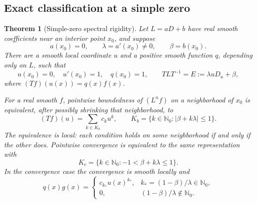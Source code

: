 \documentclass[11pt,reqno]{amsart}
\numberwithin{equation}{section}
\newtheorem{theorem}{Theorem}[section]
\theoremstyle{definition}
\theoremstyle{remark}
\newcommand{\N}{\mathbb N_0}
\begin{document}
\subsection{Exact classification at a simple zero}
\begin{theorem}[Simple-zero spectral rigidity]\label{thm:simple}
Let $L=aD+b$ have real smooth coefficients near an interior point $x_0$, and suppose
\[
 a(x_0)=0,\qquad \lambda=a'(x_0)\ne0,\qquad \beta=b(x_0).
\]
There are a smooth local coordinate $u$ and a positive smooth function $q$, depending only on $L$, such that
\[
 u(x_0)=0,\quad u'(x_0)=1,\quad q(x_0)=1,
 \qquad TL T^{-1}=E:=\lambda uD_u+\beta,
\]
where $(Tf)(u(x))=q(x)f(x)$.

For a real smooth $f$, pointwise boundedness of $(L^nf)$ on a neighborhood of $x_0$ is equivalent, after possibly shrinking that neighborhood, to
\begin{equation}\label{eq:boundedmodes}
 (Tf)(u)=\sum_{k\in K_b}c_k u^k,
 \qquad K_b=\{k\in\N:|\beta+k\lambda|\le1\}.
\end{equation}
The equivalence is local: each condition holds on some neighborhood if and only if the other does. Pointwise convergence is equivalent to the same representation with
\begin{equation}\label{eq:convergentmodes}
 K_c=\{k\in\N:-1<\beta+k\lambda\le1\}.
\end{equation}
In the convergence case the convergence is smooth locally and
\begin{equation}\label{eq:reslimit}
 q(x)g(x)=
 \begin{cases}
 c_{k_*}u(x)^{k_*},& k_*=(1-\beta)/\lambda\in\N,\\
 0,&(1-\beta)/\lambda\notin\N.
 \end{cases}
\end{equation}
\end{theorem}
\end{document}

